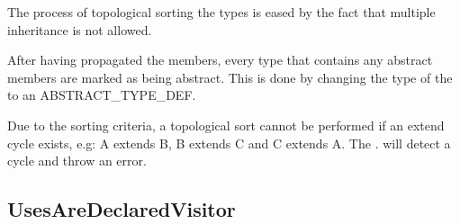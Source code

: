 The process of topological sorting the types is eased by the fact that multiple inheritance is not allowed.
 
After having propagated the members, every type that contains any abstract members are marked as being abstract. This is done by changing the type of the  to an ABSTRACT\_TYPE\_DEF.

Due to the sorting criteria, a topological sort cannot be performed if an extend cycle exists, e.g: A extends B, B extends C and C extends A. The . will detect a cycle and throw an error.

\subsection{UsesAreDeclaredVisitor}
\label{sec:usesaredeclaredvisitor}

